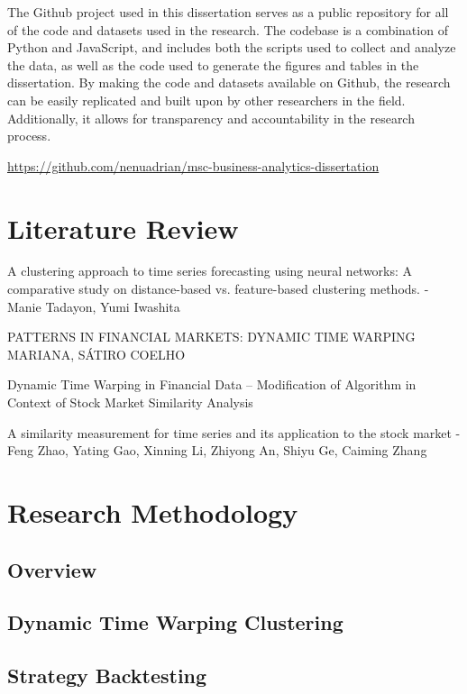 \documentclass[12pt]{article}
\begin{document}
The Github project used in this dissertation serves as a public repository for all of the code and datasets used in the research. The codebase is a combination of Python and JavaScript, and includes both the scripts used to collect and analyze the data, as well as the code used to generate the figures and tables in the dissertation. By making the code and datasets available on Github, the research can be easily replicated and built upon by other researchers in the field. Additionally, it allows for transparency and accountability in the research process.

\url{https://github.com/nenuadrian/msc-business-analytics-dissertation}


\section{Literature Review}

A clustering approach to time series forecasting using neural networks: A comparative study on distance-based vs. feature-based clustering methods. - Manie Tadayon, Yumi Iwashita \cite{ref1}


PATTERNS IN FINANCIAL MARKETS: DYNAMIC TIME WARPING MARIANA, SÁTIRO COELHO  \cite{ref2}


Dynamic Time Warping in Financial Data – Modification of Algorithm in Context of Stock Market Similarity Analysis  \cite{ref3}

A similarity measurement for time series and its application to the stock market - Feng Zhao, Yating Gao, Xinning Li, Zhiyong An, Shiyu Ge, Caiming Zhang  \cite{ref4}


\section{Research Methodology}

\subsection{Overview}

\subsection{Dynamic Time Warping Clustering}

\subsection{Strategy Backtesting}
\end{document}
